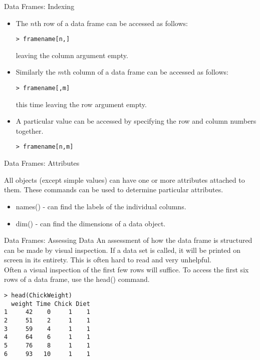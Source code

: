 \documentclass[pdf,default,slideColor,colorBG]{prosper}
\begin{document}


\begin{slide}{Data Frames: Indexing}

\begin{itemize}
\item The $n$th row of a data frame can be accessed as follows:
\begin{verbatim}
> framename[n,]
\end{verbatim}
leaving the column argument empty. \item Similarly the $m$th
column of a data frame can be accessed as follows:
\begin{verbatim}
> framename[,m]
\end{verbatim}
this time leaving the row argument empty.

\item A particular value can be accessed by specifying the row and
column numbers together.
\begin{verbatim}
> framename[n,m]
\end{verbatim}
\end{itemize}

\end{slide}



\begin{slide}{Data Frames: Attributes}

All objects (except simple values) can have one or more attributes attached to them.
These commands can be used to determine particular attributes.
\begin{itemize}
    \item names() - can find the labels of the individual columns.
    \item dim() - can find the dimensions of a data object.
\end{itemize}

\end{slide}

\begin{slide}{Data Frames: Assessing Data}
An assessment of how the data frame is structured can be made by visual inspection.
If a data set is called, it will be printed on screen in its entirety.
This is often hard to read and very unhelpful. \\ Often a visual inspection of the first few rows will suffice.
To access the first six rows of a data frame, use the head() command.
\begin{verbatim}
> head(ChickWeight)
  weight Time Chick Diet
1     42    0     1    1
2     51    2     1    1
3     59    4     1    1
4     64    6     1    1
5     76    8     1    1
6     93   10     1    1
\end{verbatim}
\end{slide}
\end{document}
